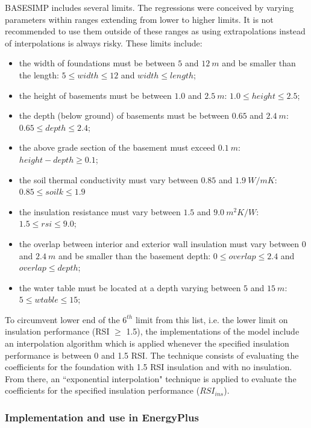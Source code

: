BASESIMP includes several limits.  The regressions were conceived  by varying parameters within ranges extending from lower to higher limits.  It is not recommended to use them outside of these ranges as using extrapolations instead of interpolations is always risky.  These limits include:
\begin{flushleft}
\begin{itemize}
    \item the width of foundations must be between $5$ and $12 \: m$ and be smaller than the length: $5 \leq width \leq 12$ and $width \leq length$;
    \item the height of basements must be between $1.0$ and $2.5 \: m$: $1.0 \leq height \leq 2.5$;
    \item the depth (below ground) of basements must be between $0.65$ and $2.4 \: m$: $0.65 \leq depth \leq 2.4$;
    \item the above grade section of the basement must exceed $0.1 \: m$: $height-depth \geq 0.1$;
    \item the soil thermal conductivity must vary between $0.85$ and $1.9 \: W/mK$: $0.85 \leq soilk \leq 1.9$
    \item the insulation resistance must vary between $1.5$ and $9.0 \: m^2K/W$: $1.5 \leq rsi \leq 9.0$;
    \item the overlap between interior and exterior wall insulation must vary between $0$ and $2.4 \: m$ and be smaller than the basement depth: $0 \leq overlap \leq 2.4$ and $overlap \leq depth$;
    \item the water table must be located at a depth varying between $5$ and $15 \: m$: $5 \leq wtable \leq 15$;
\end{itemize}
\end{flushleft}

To circumvent lower end of the $6^{th}$ limit from this list, i.e. the lower limit on insulation performance (RSI $\geq$ 1.5), the implementations of the model include an interpolation algorithm which is applied whenever the specified insulation performance is between 0 and 1.5 RSI.  The technique consists of evaluating the coefficients for the foundation with 1.5 RSI insulation and with no insulation.  From there, an ``exponential interpolation" technique is applied to evaluate the coefficients for the specified insulation performance ($RSI_{ins}$).


\subsubsection{Implementation and use in EnergyPlus}\label{beaseSimp-Eplus}

